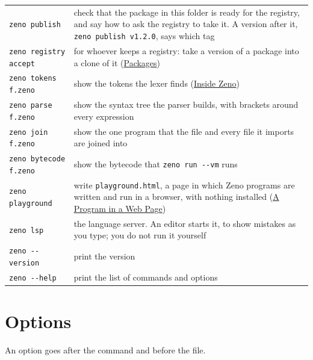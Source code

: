 \begin{longtable}{lP{8.6cm}}
\verb|zeno publish| & check that the package in this folder is ready
  for the registry, and say how to ask the registry to take it. A
  version after it, \verb|zeno publish v1.2.0|, says which tag \\
\verb|zeno registry accept| & for whoever keeps a registry: take a
  version of a package into a clone of it
  (\hyperref[ch-packages]{Packages}) \\
\verb|zeno tokens f.zeno| & show the tokens the lexer finds
  (\hyperref[ch-inside]{Inside Zeno}) \\
\verb|zeno parse f.zeno| & show the syntax tree the parser builds, with
  brackets around every expression \\
\verb|zeno join f.zeno| & show the one program that the file and every
  file it imports are joined into \\
\verb|zeno bytecode f.zeno| & show the bytecode that \verb|zeno run --vm|
  runs \\
\verb|zeno playground| & write \verb|playground.html|, a page in which
  Zeno programs are written and run in a browser, with nothing installed
  (\hyperref[ch-web]{A Program in a Web Page}) \\
\verb|zeno lsp| & the language server. An editor starts it, to show
  mistakes as you type; you do not run it yourself \\
\verb|zeno --version| & print the version \\
\verb|zeno --help| & print the list of commands and options \\
\bottomrule
\end{longtable}

\section{Options}

An option goes after the command and before the file.

